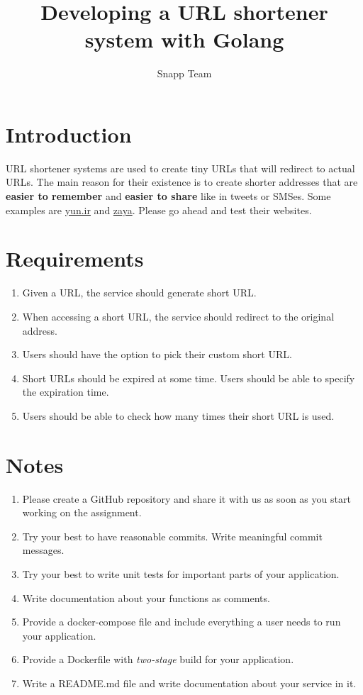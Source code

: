 \documentclass{article}
\begin{document}
\title{Developing a URL shortener system with Golang}
\author{Snapp Team}

\maketitle
\tableofcontents

\section{Introduction}

URL shortener systems are used to create tiny URLs that will redirect to actual URLs.
The main reason for their existence is to create shorter addresses that are \textbf{easier to remember} and \textbf{easier to share} like in tweets or SMSes.
Some examples are \href{https://yun.ir/}{yun.ir} and \href{https://zaya.io/}{zaya}. Please go ahead and test their websites.

\section{Requirements}

\begin{enumerate}
  \item Given a URL, the service should generate short URL.
  \item When accessing a short URL, the service should redirect to the original address.
  \item Users should have the option to pick their custom short URL.
  \item Short URLs should be expired at some time. Users should be able to specify the expiration time.
  \item Users should be able to check how many times their short URL is used.
\end{enumerate}

\section{Notes}

\begin{enumerate}
  \item Please create a GitHub repository and share it with us as soon as you start working on the assignment.
  \item Try your best to have reasonable commits. Write meaningful commit messages.
  \item Try your best to write unit tests for important parts of your application.
  \item Write documentation about your functions as comments.
  \item Provide a docker-compose file and include everything a user needs to run your application.
  \item Provide a Dockerfile with \textit{two-stage} build for your application.
  \item Write a README.md file and write documentation about your service in it.
\end{enumerate}
\end{document}
